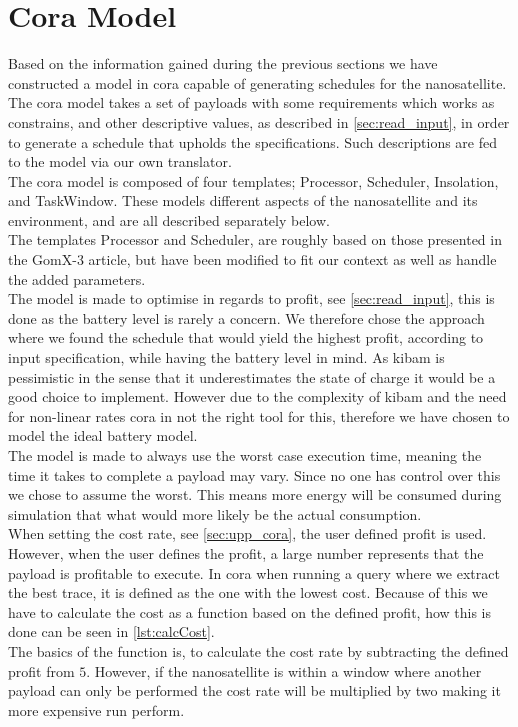 \section{Cora Model} \label{sec:cora}
Based on the information gained during the previous sections we have constructed a model in \gls{cora} capable of generating schedules for the nanosatellite. The \gls{cora} model takes a set of payloads with some requirements which works as constrains, and other descriptive values, as described in \cref{sec:read_input}, in order to generate a schedule that upholds the specifications. Such descriptions are fed to the model via our own translator.\\
The \gls{cora} model is composed of four templates; Processor, Scheduler, Insolation, and TaskWindow. These models different aspects of the nanosatellite and its environment, and are all described separately below.\\
The templates Processor and Scheduler, are roughly based on those presented in the GomX-3 article\cite{gomx3}, but have been modified to fit our context as well as handle the added parameters.\\
The model is made to optimise in regards to profit, see \cref{sec:read_input}, this is done as the battery level is rarely a concern\cite{gom_space_conversation}. We therefore chose the approach where we found the schedule that would yield the highest profit, according to input specification, while having the battery level in mind. As \gls{kibam} is pessimistic in the sense that it underestimates the state of charge it would be a good choice to implement. However due to the complexity of \gls{kibam} and the need for non-linear rates \gls{cora} in not the right tool for this, therefore we have chosen to model the ideal battery model.\\
The model is made to always use the worst case execution time, meaning the time it takes to complete a payload may vary. Since no one has control over this we chose to assume the worst. This means more energy will be consumed during simulation that what would more likely be the actual consumption.\\
When setting the cost rate, see \cref{sec:upp_cora}, the user defined profit is used. However, when the user defines the profit, a large number represents that the payload is profitable to execute. In \gls{cora} when running a query where we extract the best trace, it is defined as the one with the lowest cost. Because of this we have to calculate the cost as a function based on the defined profit, how this is done can be seen in \cref{lst:calcCost}.\\
The basics of the function  is, to calculate the cost rate by subtracting the defined profit from $5$. However, if the nanosatellite is within a window where another payload can only be performed the cost rate will be multiplied by two making it more expensive run perform.\\


